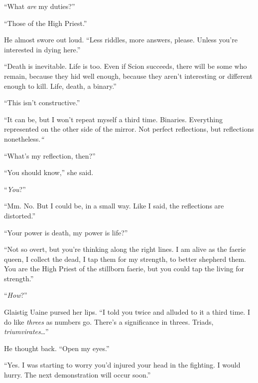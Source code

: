 ``What \emph{are} my duties?''



``Those of the High Priest.''



He almost swore out loud.  ``Less riddles, more answers, please.  Unless you're interested in dying here.''



``Death is inevitable.  Life is too.  Even if Scion succeeds, there will be some who remain, because they hid well enough, because they aren't interesting or different enough to kill.  Life, death, a binary.''



``This isn't constructive.''



``It can be, but I won't repeat myself a third time.  Binaries.  Everything represented on the other side of the mirror.  Not perfect reflections, but reflections nonetheless.\emph{``}



``What's my reflection, then?''



``You should know,'' she said.



``\emph{You}?''



``Mm.  No.  But I could be, in a small way.  Like I said, the reflections are distorted.''



``Your power is death, my power is life?''



``Not so overt, but you're thinking along the right lines.  I am alive as the faerie queen, I collect the dead, I tap them for my strength, to better shepherd them.  You are the High Priest of the stillborn faerie, but you could tap the living for strength.''



``\emph{How}?''



Glaistig Uaine pursed her lips.  ``I told you twice and alluded to it a third time.  I do like \emph{threes }as numbers go.  There's a significance in threes.  Triads, \emph{triumvirates}\ldots''



He thought back.  ``Open my eyes.''



``Yes.  I was starting to worry you'd injured your head in the fighting.  I would hurry.  The next demonstration will occur soon.''



